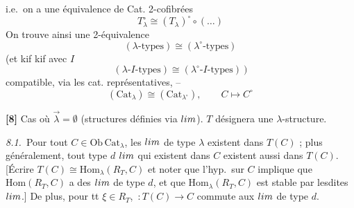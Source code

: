 \documentclass[11pt,a4paper]{article}
\begin{document}
i.e.\ on a une équivalence de Cat. 2-cofibrées
\begin{equation}
  T^{\circ}_{\lambda} \cong (T_{\lambda})^{\circ} \circ (\ldots)
  \tag{7.1}
\end{equation}
On trouve ainsi une 2-équivalence
\begin{equation}
  (\lambda\text{-types}) \cong (\lambda^{\circ}\text{-types})
  \tag{7.3}
\end{equation}
(et kif kif avec $I$
\begin{equation}
  (\lambda\text{-}I\text{-types}) \cong
  (\lambda^{\circ}\text{-}I\text{-types})\ )
  \tag{7.4}
\end{equation}
compatible, via les cat. représentatives, --
\begin{equation}
  (\mathrm{Cat}_{\lambda}) \cong (\mathrm{Cat}_{\lambda^{\circ}}),
  \qquad C \longmapsto C^{\circ}
  \tag{7.6}
\end{equation}

\textbf{[8]} Cas où $\overrightarrow{\lambda} = \emptyset$ (structures
définies via $\varprojlim$). $T$ désignera une $\lambda$-structure.

\emph{8.1.}\ Pour tout $C \in \mathrm{Ob}\,\mathrm{Cat}_{\lambda}$,
les  $\varprojlim$ de type $\lambda$ existent dans
$T(C)$ ; plus généralement,   tout type $d$
\struck{\ill{}}  $\varprojlim$ qui existent dans $C$ existent
aussi dans $T(C)$. [Écrire $T(C) \cong \mathrm{Hom}_{\lambda}(R_{T}, C)$
et noter que \struck{\ill{}} l'hyp.\ sur $C$ implique que
$\mathrm{Hom}(R_{T}, C)$  \struck{\ill{}} a des
$\varprojlim$ de type $d$, et que \struck{\ill{}} $\mathrm{Hom}_{\lambda}
(R_{T}, C)$ est stable par lesdites $\varprojlim$.] De plus, pour
tt $\xi \in R_{T}$, \struck{\ill{}} \,$: T(C) \to
C$ commute aux $\varprojlim$ de type $d$.
\end{document}
